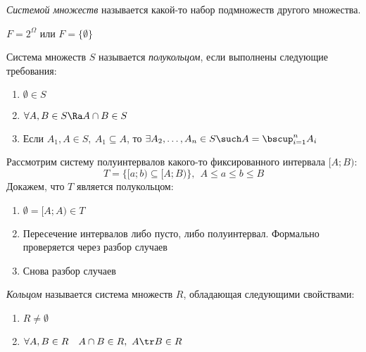 \begin{definition}
	\textit{Системой множеств} называется какой-то набор подмножеств другого множества.
\end{definition}

\begin{example}
	$F = 2^\Omega$ или $F = \{\emptyset\}$
\end{example}

\begin{definition}
	Система множеств $S$ называется \textit{полукольцом}, если выполнены следующие требования:
	\begin{enumerate}
		\item \(\emptyset \in S\)
		
		\item \(\forall A, B \in S \Ra A \cap B \in S\)
		
		\item Если $A_1, A \in S,\ A_1 \subseteq A$, то \(\exists A_2, \ldots, A_n \in S \such A = \bscup_{i = 1}^n A_i\)
	\end{enumerate}
\end{definition}

\begin{example}
	Рассмотрим систему полуинтервалов какого-то фиксированного интервала $[A; B)$:
	\[
		T = \{[a; b) \subseteq [A; B)\},\ \ A \le a \le b \le B
	\]
	Докажем, что $T$ является полукольцом:
	\begin{enumerate}
		\item $\emptyset = [A; A) \in T$
		
		\item Пересечение интервалов либо пусто, либо полуинтервал. Формально проверяется через разбор случаев
		
		\item Снова разбор случаев
	\end{enumerate}
\end{example}

\begin{definition}
	\textit{Кольцом} называется система множеств $R$, обладающая следующими свойствами:
	\begin{enumerate}
		\item \(R \neq \emptyset\)
		
		\item \(\forall A, B \in R \quad A \cap B \in R,\ A \tr B \in R\)
	\end{enumerate}
\end{definition}

